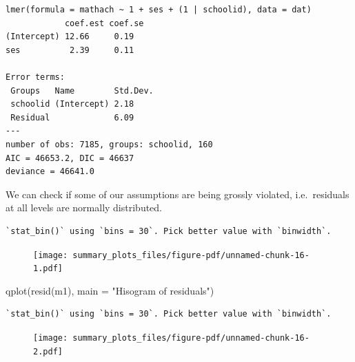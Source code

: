 \documentclass[
  letterpaper,
  DIV=11,
  numbers=noendperiod]{scrreprt}
\newenvironment{Shaded}{\begin{snugshade}}{\end{snugshade}}
\newcommand{\AttributeTok}[1]{\textcolor[rgb]{0.49,0.56,0.16}{#1}}
\newcommand{\DecValTok}[1]{\textcolor[rgb]{0.25,0.63,0.44}{#1}}
\newcommand{\FunctionTok}[1]{\textcolor[rgb]{0.02,0.16,0.49}{#1}}
\newcommand{\NormalTok}[1]{\textcolor[rgb]{0.00,0.44,0.13}{#1}}
\newcommand{\SpecialCharTok}[1]{\textcolor[rgb]{0.25,0.44,0.63}{#1}}
\newcommand{\StringTok}[1]{\textcolor[rgb]{0.25,0.44,0.63}{#1}}
\begin{document}
\begin{verbatim}
lmer(formula = mathach ~ 1 + ses + (1 | schoolid), data = dat)
            coef.est coef.se
(Intercept) 12.66     0.19  
ses          2.39     0.11  

Error terms:
 Groups   Name        Std.Dev.
 schoolid (Intercept) 2.18    
 Residual             6.09    
---
number of obs: 7185, groups: schoolid, 160
AIC = 46653.2, DIC = 46637
deviance = 46641.0 
\end{verbatim}

We can check if some of our assumptions are being grossly violated,
i.e.~residuals at all levels are normally distributed.

\begin{Shaded}
\end{Shaded}

\begin{verbatim}
`stat_bin()` using `bins = 30`. Pick better value with `binwidth`.
\end{verbatim}

\begin{figure}[H]

{\centering \texttt{[image: summary\_plots\_files/figure-pdf/unnamed-chunk-16-1.pdf]}

}

\end{figure}

\begin{Shaded}
\begin{Highlighting}[]
  \FunctionTok{qplot}\NormalTok{(}\FunctionTok{resid}\NormalTok{(m1), }
       \AttributeTok{main =} \StringTok{"Hisogram of residuals"}\NormalTok{)}
\end{Highlighting}
\end{Shaded}

\begin{verbatim}
`stat_bin()` using `bins = 30`. Pick better value with `binwidth`.
\end{verbatim}

\begin{figure}[H]

{\centering \texttt{[image: summary\_plots\_files/figure-pdf/unnamed-chunk-16-2.pdf]}

}

\end{figure}
\end{document}
